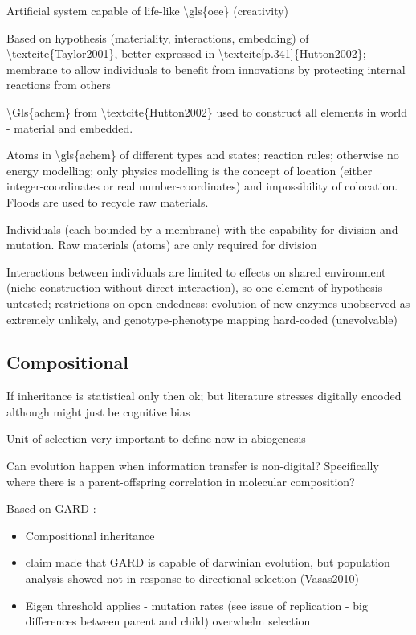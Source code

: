 Artificial system capable of life-like \textbackslash{}gls\{oee\} (creativity)

Based on hypothesis (materiality, interactions, embedding) of \textbackslash{}textcite\{Taylor2001\}, better expressed in \textbackslash{}textcite{[}p.341{]}\{Hutton2002\}; membrane to allow
individuals to benefit from innovations by protecting internal reactions from others

\textbackslash{}Gls\{achem\} from \textbackslash{}textcite\{Hutton2002\} used to construct all elements in world - material and embedded.

Atoms in \textbackslash{}gls\{achem\} of different types and states; reaction rules; otherwise no energy modelling; only physics modelling is the concept of location (either integer-coordinates or real number-coordinates) and impossibility of colocation. Floods are used to recycle raw materials.

Individuals (each bounded by a membrane) with the capability for division and mutation. Raw materials (atoms) are only required for division

Interactions between individuals are limited to effects on shared environment (niche construction without direct interaction), so one element of hypothesis untested; restrictions on open-endedness: evolution of new enzymes unobserved as extremely unlikely, and genotype-phenotype mapping hard-coded (unevolvable)

\subsection{Compositional}

\parencite{Vasas2015, Vasas2012, Vasas2012a}

If inheritance is statistical only then ok; but literature stresses digitally encoded although might just be cognitive bias

Unit of selection very important to define now in abiogenesis

Can evolution happen when information transfer is non-digital? Specifically where there is a parent-offspring correlation in molecular composition?

Based on GARD \parencite{Segre1998}:

\begin{itemize}
	\item Compositional inheritance
	
	\item claim made that GARD is capable of darwinian evolution, but
	population analysis showed not in response to directional selection
	(Vasas2010)
	
	\item Eigen threshold applies - mutation rates (see issue of replication -
	big differences between parent and child) overwhelm selection
\end{itemize}

